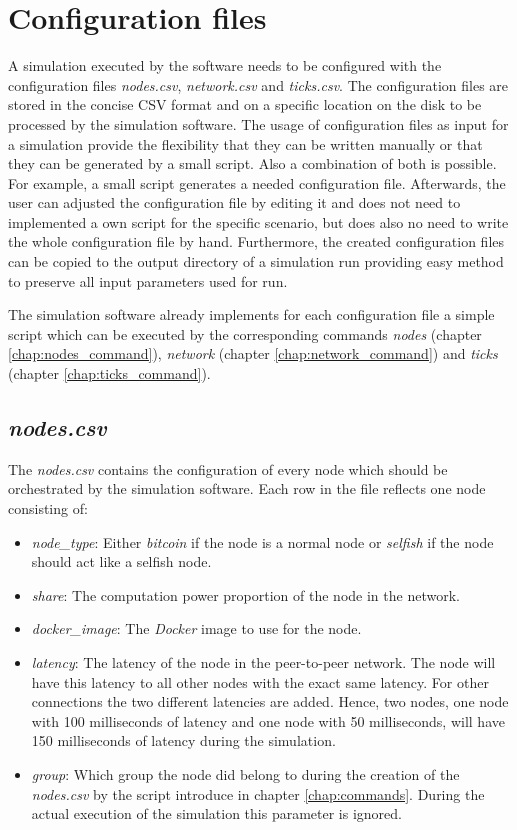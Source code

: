 \section{Configuration files}
\label{chap:config_files}

A simulation executed by the software needs to be configured with the configuration files \textit{nodes.csv}, \textit{network.csv} and \textit{ticks.csv}.
The configuration files are stored in the concise CSV format and on a specific location on the disk to be processed by the simulation software.
The usage of configuration files as input for a simulation provide the flexibility that they can be written manually or that they can be generated by a small script.
Also a combination of both is possible.
For example, a small script generates a needed configuration file.
Afterwards, the user can adjusted the configuration file by editing it and does not need to implemented a own script for the specific scenario, but does also no need to write the whole configuration file by hand.
Furthermore, the created configuration files can be copied to the output directory of a simulation run providing easy method to preserve all input parameters used for run.

The simulation software already implements for each configuration file a simple script which can be executed by the corresponding commands \textit{nodes} (chapter \ref{chap:nodes_command}), \textit{network} (chapter \ref{chap:network_command}) and \textit{ticks} (chapter \ref{chap:ticks_command}).

\subsection{\textit{nodes.csv}}

The \textit{nodes.csv} contains the configuration of every node which should be orchestrated by the simulation software.
Each row in the file reflects one node consisting of:
\begin{itemize}
	\item \textit{node\_type}: Either \textit{bitcoin} if the node is a normal node or \textit{selfish} if the node should act like a selfish node.
	\item \textit{share}: The computation power proportion of the node in the network.
	\item \textit{docker\_image}: The \textit{Docker} image to use for the node.
	\item \textit{latency}: The latency  of the node in the peer-to-peer network.
	The node will have this latency to all other nodes with the exact same latency.
	For other connections the two different latencies are added.
	Hence, two nodes, one node with 100 milliseconds of latency and one node with 50 milliseconds, will have 150 milliseconds of latency during the simulation.
	\item \textit{group}: Which group the node did belong to during the creation of the \textit{nodes.csv} by the script introduce in chapter \ref{chap:commands}.
	During the actual execution of the simulation this parameter is ignored.
\end{itemize}
 
